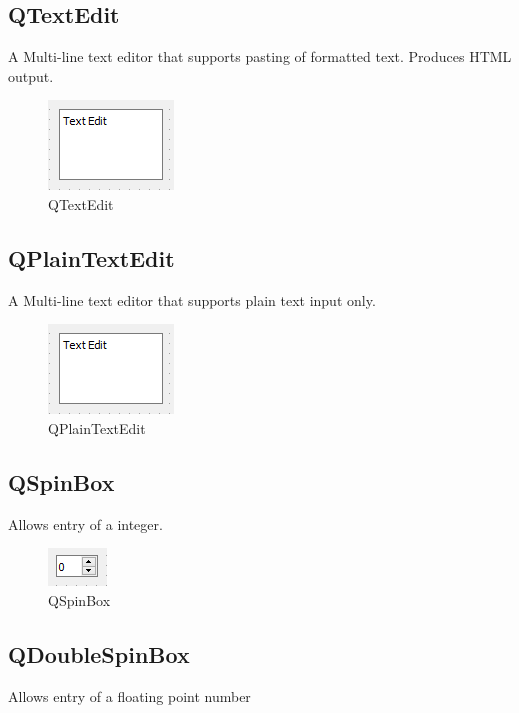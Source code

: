\documentclass[a4paper,10pt]{book}
\begin{document}
\subsection{QTextEdit}
A Multi-line text editor that supports pasting of formatted text. Produces HTML output.

\begin {figure}[!ht]
 \centering
 \includegraphics[scale=1.0]{images/widget/qtextedit}
 \caption{QTextEdit}
\end {figure}

\subsection{QPlainTextEdit}

A Multi-line text editor that supports plain text input only.

\begin {figure}[!ht]
 \centering
 \includegraphics[scale=1.0]{images/widget/qtextedit}
 \caption{QPlainTextEdit}
\end {figure}

\subsection{QSpinBox}

Allows entry of a integer.

\begin {figure}[!ht]
 \centering
 \includegraphics[scale=1.0]{images/widget/qspinbox}
 \caption{QSpinBox}
\end {figure}


\subsection{QDoubleSpinBox}
Allows entry of a floating point number
\end{document}
